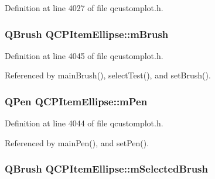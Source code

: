Definition at line 4027 of file qcustomplot.\+h.

\hypertarget{class_q_c_p_item_ellipse_a6fa59478cd3ad1b10e6c1f6cedc84bd6}{}
\subsubsection[{m\+Brush}]{\setlength{\rightskip}{0pt plus 5cm}Q\+Brush Q\+C\+P\+Item\+Ellipse\+::m\+Brush\hspace{0.3cm}{\ttfamily [protected]}}\label{class_q_c_p_item_ellipse_a6fa59478cd3ad1b10e6c1f6cedc84bd6}


Definition at line 4045 of file qcustomplot.\+h.



Referenced by main\+Brush(), select\+Test(), and set\+Brush().

\hypertarget{class_q_c_p_item_ellipse_a16ad9389acf028a7e4ac8fd7a550b2e4}{}
\subsubsection[{m\+Pen}]{\setlength{\rightskip}{0pt plus 5cm}Q\+Pen Q\+C\+P\+Item\+Ellipse\+::m\+Pen\hspace{0.3cm}{\ttfamily [protected]}}\label{class_q_c_p_item_ellipse_a16ad9389acf028a7e4ac8fd7a550b2e4}


Definition at line 4044 of file qcustomplot.\+h.



Referenced by main\+Pen(), and set\+Pen().

\hypertarget{class_q_c_p_item_ellipse_a2e49d5547478aa36910ed8a2dcc8a5c0}{}
\subsubsection[{m\+Selected\+Brush}]{\setlength{\rightskip}{0pt plus 5cm}Q\+Brush Q\+C\+P\+Item\+Ellipse\+::m\+Selected\+Brush\hspace{0.3cm}{\ttfamily [protected]}}\label{class_q_c_p_item_ellipse_a2e49d5547478aa36910ed8a2dcc8a5c0}


